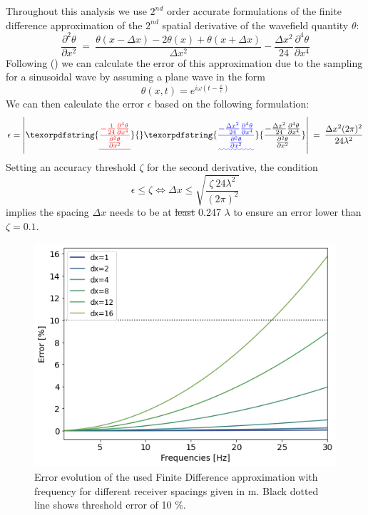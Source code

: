 \documentclass{article} %
\providecommand{\DIFaddtex}[1]{{\protect\color{blue}\uwave{#1}}} %
\providecommand{\DIFdeltex}[1]{{\protect\color{red}\sout{#1}}}                      %
\providecommand{\DIFaddbegin}{} %
\providecommand{\DIFaddend}{} %
\providecommand{\DIFdelbegin}{} %
\providecommand{\DIFdelend}{} %
\providecommand{\DIFadd}[1]{\texorpdfstring{\DIFaddtex{#1}}{#1}} %
\providecommand{\DIFdel}[1]{\texorpdfstring{\DIFdeltex{#1}}{}} %
\newcommand{\DIFscaledelfig}{0.5}
\newlength{\DIFdelgraphicswidth} %
\newlength{\DIFdelgraphicsheight} %
\newcommand{\DIFaddincludegraphics}[2][]{{\color{blue}\fbox{\DIFOincludegraphics[#1]{#2}}}} %
\newcommand{\DIFdelincludegraphics}[2][]{%
\sbox{\DIFdelgraphicsbox}{\DIFOincludegraphics[#1]{#2}}%
\settoboxwidth{\DIFdelgraphicswidth}{\DIFdelgraphicsbox} %
\settoboxtotalheight{\DIFdelgraphicsheight}{\DIFdelgraphicsbox} %
\scalebox{\DIFscaledelfig}{%
\parbox[b]{\DIFdelgraphicswidth}{\usebox{\DIFdelgraphicsbox}\\[-\baselineskip] \rule{\DIFdelgraphicswidth}{0em}}\llap{\resizebox{\DIFdelgraphicswidth}{\DIFdelgraphicsheight}{%
\setlength{\unitlength}{\DIFdelgraphicswidth}%
\begin{picture}(1,1)%
\thicklines\linethickness{2pt} %
{\color[rgb]{1,0,0}\put(0,0){\framebox(1,1){}}}%
{\color[rgb]{1,0,0}\put(0,0){\line( 1,1){1}}}%
{\color[rgb]{1,0,0}\put(0,1){\line(1,-1){1}}}%
\end{picture}%
}\hspace*{3pt}}} %
} %
\DeclareRobustCommand{\DIFaddbegin}{\DIFOaddbegin \let\includegraphics\DIFaddincludegraphics} %
\DeclareRobustCommand{\DIFaddend}{\DIFOaddend \let\includegraphics\DIFOincludegraphics} %
\DeclareRobustCommand{\DIFdelbegin}{\DIFOdelbegin \let\includegraphics\DIFdelincludegraphics} %
\DeclareRobustCommand{\DIFdelend}{\DIFOaddend \let\includegraphics\DIFOincludegraphics} %
\begin{document}
	Throughout this analysis we use $2^{nd}$ order accurate formulations of the finite difference approximation of the $2^{nd}$ spatial derivative of the wavefield quantity $\theta$:
	\begin{equation}
		\frac{\partial^{2} \theta}{\partial x^{2}} \: = \: \frac{\theta(x-\Delta x) - 2 \theta(x) + \theta(x+ \Delta x)}{\Delta x^{2}} -  \frac{\Delta x^{2}}{24} \frac{\partial^{4} \theta}{\partial x^{4}}
	\end{equation}
	Following (\cite{Langston1}) we can calculate the error of this approximation due to the sampling for a sinusoidal wave by assuming a plane wave in the form
	\begin{equation}
		\theta(x,t) = e^{i \omega (t-\frac{x}{c})}
	\end{equation}
	We can then calculate the error $\epsilon$ based on the following formulation:
	\begin{equation}
		\epsilon = \left| \DIFdelbegin \DIFdel{\frac{-\frac{1}{24} \frac{\partial^{4} \theta}{\partial x^{4}}}{\frac{\partial^{2} \theta}{\partial x^{2}}} }\DIFdelend \DIFaddbegin \DIFadd{\frac{-\frac{\Delta x^{2}}{24} \frac{\partial^{4} \theta}{\partial x^{4}}}{\frac{\partial^{2} \theta}{\partial x^{2}}} }\DIFaddend \right| \: = \: \frac{\Delta x^{2} (2 \pi)^{2}}{24 \lambda^{2}}
	\end{equation}
	Setting an accuracy threshold $\zeta$ for the second derivative, the condition
	\begin{equation}
		\epsilon \le \zeta \Leftrightarrow \Delta x \le \sqrt{\frac{\zeta \: 24 \lambda^{2}}{(2 \pi)^{2}}}
	\end{equation}
	implies the spacing $\Delta x$ needs to be at \DIFdelbegin \DIFdel{least }\DIFdelend \DIFaddbegin \DIFadd{most }\DIFaddend 0.247 $\lambda$ to ensure an error lower than $\zeta=0.1$.

	\begin{figure}[H]
		\centering
		\includegraphics[width =0.5\linewidth]{../Figures/error.png}
		\captionsetup{width=\linewidth}
		\caption{Error evolution of the used Finite Difference approximation with frequency for different receiver spacings given in m. Black dotted line shows threshold error of 10 $\%$.}
		\label{fig:error}
	\end{figure}
\end{document}
